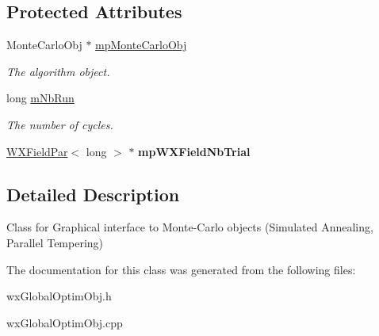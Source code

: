 \subsection*{Protected Attributes}
\begin{DoxyCompactItemize}
\item 
\mbox{\label{class_obj_cryst_1_1_w_x_monte_carlo_obj_aabf6054ded526d3420f94f15e4041c96}} 
Monte\+Carlo\+Obj $\ast$ \mbox{\hyperlink{class_obj_cryst_1_1_w_x_monte_carlo_obj_aabf6054ded526d3420f94f15e4041c96}{mp\+Monte\+Carlo\+Obj}}
\begin{DoxyCompactList}\small\item\em The algorithm object. \end{DoxyCompactList}\item 
\mbox{\label{class_obj_cryst_1_1_w_x_monte_carlo_obj_a60b17ba417b67f8c621b5b714d68e3b0}} 
long \mbox{\hyperlink{class_obj_cryst_1_1_w_x_monte_carlo_obj_a60b17ba417b67f8c621b5b714d68e3b0}{m\+Nb\+Run}}
\begin{DoxyCompactList}\small\item\em The number of cycles. \end{DoxyCompactList}\item 
\mbox{\label{class_obj_cryst_1_1_w_x_monte_carlo_obj_a33e32f028bdeb510fbd9885eeafab809}} 
\mbox{\hyperlink{class_obj_cryst_1_1_w_x_field_par}{W\+X\+Field\+Par}}$<$ long $>$ $\ast$ {\bfseries mp\+W\+X\+Field\+Nb\+Trial}
\end{DoxyCompactItemize}


\subsection{Detailed Description}
Class for Graphical interface to Monte-\/\+Carlo objects (Simulated Annealing, Parallel Tempering) 

The documentation for this class was generated from the following files\+:\begin{DoxyCompactItemize}
\item 
wx\+Global\+Optim\+Obj.\+h\item 
wx\+Global\+Optim\+Obj.\+cpp\end{DoxyCompactItemize}
